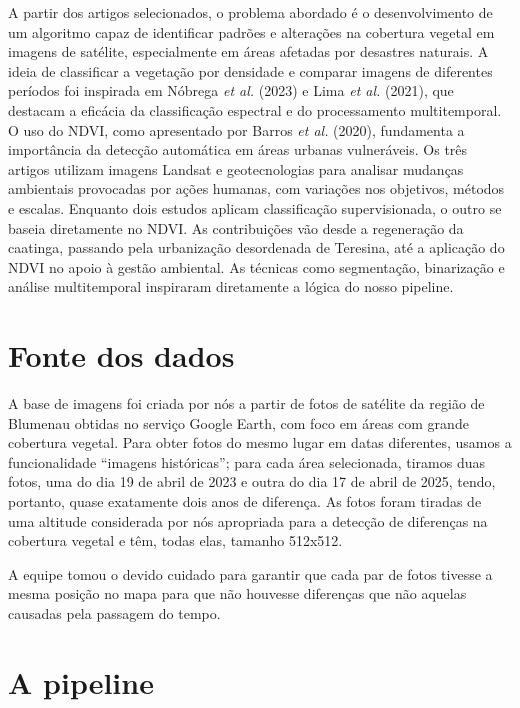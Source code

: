 \documentclass{article}
\begin{document}
A partir dos artigos selecionados, o problema abordado é o desenvolvimento de um algoritmo capaz de identificar padrões e alterações na cobertura vegetal em imagens de satélite, especialmente em áreas afetadas por desastres naturais. A ideia de classificar a vegetação por densidade e comparar imagens de diferentes períodos foi inspirada em Nóbrega \textit{et al.} (2023)\cite{artigo01} e Lima \textit{et al.} (2021)\cite{artigo03}, que destacam a eficácia da classificação espectral e do processamento multitemporal. O uso do NDVI, como apresentado por Barros \textit{et al.} (2020)\cite{artigo02}, fundamenta a importância da detecção automática em áreas urbanas vulneráveis. Os três artigos utilizam imagens Landsat e geotecnologias para analisar mudanças ambientais provocadas por ações humanas, com variações nos objetivos, métodos e escalas. Enquanto dois estudos\cite{artigo01, artigo03} aplicam classificação supervisionada, o outro\cite{artigo02} se baseia diretamente no NDVI. As contribuições vão desde a regeneração da caatinga\cite{artigo01}, passando pela urbanização desordenada de Teresina\cite{artigo03}, até a aplicação do NDVI no apoio à gestão ambiental\cite{artigo02}. As técnicas como segmentação, binarização e análise multitemporal inspiraram diretamente a lógica do nosso pipeline.

\section{Fonte dos dados}

A base de imagens foi criada por nós a partir de fotos de satélite da região de Blumenau obtidas no serviço Google Earth, com foco em áreas com grande cobertura vegetal. Para obter fotos do mesmo lugar em datas diferentes, usamos a funcionalidade ``imagens históricas''; para cada área selecionada, tiramos duas fotos, uma do dia 19 de abril de 2023 e outra do dia 17 de abril de 2025, tendo, portanto, quase exatamente dois anos de diferença. As fotos foram tiradas de uma altitude considerada por nós apropriada para a detecção de diferenças na cobertura vegetal e têm, todas elas, tamanho 512x512.

A equipe tomou o devido cuidado para garantir que cada par de fotos tivesse a mesma posição no mapa para que não houvesse diferenças que não aquelas causadas pela passagem do tempo.

\section{A pipeline}
\end{document}
